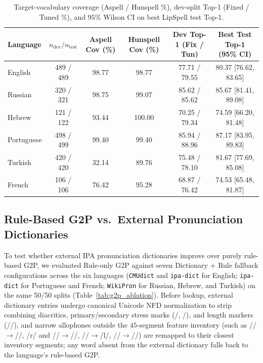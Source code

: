 \documentclass[11pt,a4paper]{article}
\begin{document}
\begin{table}[ht]
\centering
\scriptsize
\caption{Target-vocabulary coverage (Aspell / Hunspell \%), dev-split Top-1 (Fixed / Tuned \%), and $95\%$ Wilson CI on best LipSpell test Top-1.}
\label{tab:multilingual_cov}
\begin{tabular}{lccccc}
\toprule
Language & $n_{\text{dev}} / n_{\text{test}}$ & Aspell Cov (\%) & Hunspell Cov (\%) & Dev Top-1 (Fix / Tun) & Best Test Top-1 (95\% CI) \\
\midrule
English    & 489 / 489 & 98.77 & 98.77 & 77.71 / 79.55 & 80.37 [76.62, 83.65] \\
Russian    & 320 / 321 & 98.75 & 99.07 & 85.62 / 85.62 & 85.67 [81.41, 89.08] \\
Hebrew     & 121 / 122 & 93.44 & 100.00 & 70.25 / 79.34 & 74.59 [66.20, 81.48] \\
Portuguese & 498 / 499 & 99.40 & 99.40 & 85.94 / 88.96 & 87.17 [83.95, 89.83] \\
Turkish    & 420 / 420 & 32.14 & 89.76 & 75.48 / 78.10 & 81.67 [77.69, 85.08] \\
French     & 106 / 106 & 76.42 & 95.28 & 68.87 / 76.42 & 74.53 [65.48, 81.87] \\
\bottomrule
\end{tabular}
\end{table}

\subsection{Rule-Based G2P vs.\ External Pronunciation Dictionaries}
To test whether external IPA pronunciation dictionaries improve over purely rule-based G2P, we evaluated Rule-only G2P against seven Dictionary + Rule fallback configurations across the six languages (\texttt{CMUdict} and \texttt{ipa-dict} \citep{opendictipadict} for English; \texttt{ipa-dict} for Portuguese and French; \texttt{WikiPron} \citep{lee2020wikipron} for Russian, Hebrew, and Turkish) on the same 50/50 splits (Table~\ref{tab:g2p_ablation}). Before lookup, external dictionary entries undergo canonical Unicode NFD normalization to strip combining diacritics, primary/secondary stress marks (/\textprimstress, \textsecstress/), and length markers (/\textlengthmark/), and narrow allophones outside the $45$-segment feature inventory (such as /\textinvscr/$\rightarrow$/\textturnr/, /r/ and //$\rightarrow$/\textfishhookr/, /\textltilde/$\rightarrow$/l/, /\textgamma/$\rightarrow$//) are remapped to their closest inventory segments; any word absent from the external dictionary falls back to the language's rule-based G2P.
\end{document}
